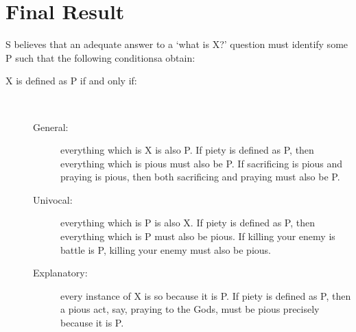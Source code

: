 \documentclass[oneside]{article}
\begin{document}
\section*{Final Result}
S believes that an adequate answer to a `what is X?' question must identify some P such that the following conditionsa obtain:
\begin{description}
\item[ X is defined as P if and only if:]\
\begin{description}
\item[General:] everything which is X is also P. If piety is defined as P, then everything which is pious must also be P. If sacrificing is pious and praying is pious, then both sacrificing and praying must also be P. 
\item[Univocal:] everything which is P is also X. If piety is defined as P, then everything which is P must also be pious. If killing your enemy is battle is P, killing your enemy must also be pious. 

\item[Explanatory:]  every instance of X is so because it is P. If piety is defined as P, then a pious act, say, praying to the Gods, must be pious precisely because it is P. 
\end{description}
\end{description}
\end{document}
